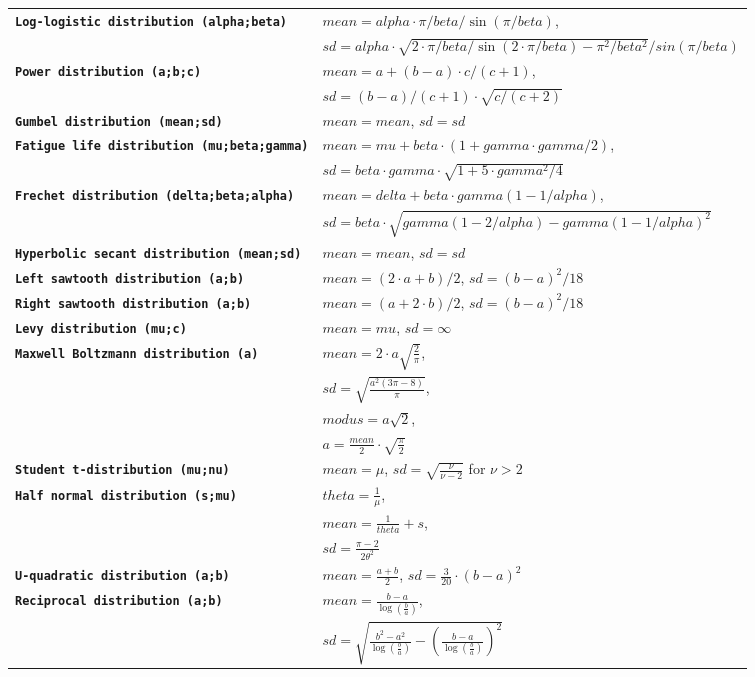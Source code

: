 \documentclass{svmono}
\def\cm#1{\textbf{\texttt{#1}}}
\begin{document}
{\begin{longtable}{l|l}
\cm{Log-logistic distribution (alpha;beta)} & $mean = alpha\cdot\pi/beta/\sin(\pi/beta)$,\\
~ & $sd = alpha\cdot\sqrt{2\cdot\pi/beta/\sin(2\cdot\pi/beta)-\pi^2/beta^2}/sin(\pi/beta)$ \\
\cm{Power distribution (a;b;c)} & $mean = a+(b-a)\cdot c/(c+1)$,\\
~ & $sd = (b-a)/(c+1)\cdot\sqrt{c/(c+2)}$ \\
\cm{Gumbel distribution (mean;sd)} & $mean = mean$, $sd = sd$ \\
\cm{Fatigue life distribution (mu;beta;gamma)} & $mean = mu+beta\cdot (1+gamma\cdot gamma/2)$,\\
~ & $sd = beta\cdot gamma\cdot\sqrt{1+5\cdot gamma^2/4}$ \\
\cm{Frechet distribution (delta;beta;alpha)} & $mean = delta+beta\cdot gamma(1-1/alpha)$,\\
~ & $sd = beta\cdot\sqrt{gamma(1-2/alpha)-gamma(1-1/alpha)^2}$ \\
\cm{Hyperbolic secant distribution (mean;sd)} & $mean = mean$, $sd = sd$ \\
\cm{Left sawtooth distribution (a;b)} & $mean = (2\cdot a+b)/2$, $sd = (b-a)^2/18$ \\
\cm{Right sawtooth distribution (a;b)} & $mean = (a+2\cdot b)/2$, $sd = (b-a)^2/18$ \\
\cm{Levy distribution (mu;c)} & $mean = mu$, $sd = \infty$ \\
\cm{Maxwell Boltzmann distribution (a)} & $mean = 2\cdot a\sqrt{\frac{2}{\pi}}$,\\
~ & $sd = \sqrt{\frac{a^2(3\pi-8)}{\pi}}$,\\
~ & $modus = a\sqrt{2}$,\\
~ & $a = \frac{mean}{2}\cdot\sqrt{\frac{\pi}{2}}$ \\
\cm{Student t-distribution (mu;nu)} & $mean = \mu$, $sd = \sqrt{\frac{\nu}{\nu-2}}$ for $\nu>2$ \\
\cm{Half normal distribution (s;mu)} & $theta = \frac{1}{\mu}$,\\
~ & $mean = \frac{1}{theta}+s$,\\
~ & $sd = \frac{\pi-2}{2\theta^2}$ \\
\cm{U-quadratic distribution (a;b)} & $mean = \frac{a+b}{2}$, $sd = \frac{3}{20}\cdot(b-a)^2$ \\
\cm{Reciprocal distribution (a;b)} & $mean = \frac{b-a}{\log\left(\frac{b}{a}\right)}$,\\
~ & $sd = \sqrt{\frac{b^2-a^2}{\log\left(\frac{b}{a}\right)}-\left(\frac{b-a}{\log\left(\frac{b}{a}\right)}\right)^2}$ \\

\end{longtable}}
\end{document}
